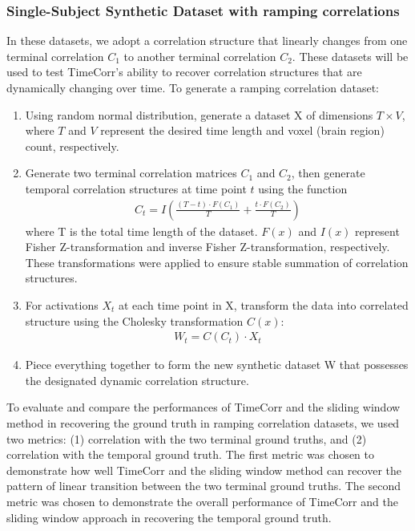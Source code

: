 \documentclass[11pt]{article}
\begin{document}
\subsubsection{Single-Subject Synthetic Dataset with ramping correlations}

In these datasets, we adopt a correlation structure that linearly changes from one terminal correlation $C_1$ to another terminal correlation $C_2$. These datasets will be used to test TimeCorr's ability to recover correlation structures that are dynamically changing over time. To generate a ramping correlation dataset:
\begin{enumerate}
\item Using random normal distribution, generate a dataset X of dimensions $T\times V$, where $T$ and $V$ represent the desired time length and voxel (brain region) count, respectively.
\item Generate two terminal correlation matrices $C_1$ and $C_2$, then generate temporal correlation structures at time point $t$ using the function
\begin{align*}
C_t = I\left(\frac{(T-t) \cdot F(C_1)}{T} + \frac{t\cdot F(C_2)}{T}\right)
\end{align*}
where T is the total time length of the dataset. $F(x)$ and $I(x)$ represent Fisher Z-transformation and inverse Fisher Z-transformation, respectively. These transformations were applied to ensure stable summation of correlation structures.
\item For activations $X_t$ at each time point in X, transform the data into correlated structure using the Cholesky transformation $C(x)$:
\begin{align*}
W_t = C(C_t) \cdot X_t
\end{align*}
\item Piece everything together to form the new synthetic dataset W that possesses the designated dynamic correlation structure.
\end{enumerate}

To evaluate and compare the performances of TimeCorr and the sliding window method in recovering the ground truth in ramping correlation datasets, we used two metrics: (1) correlation with the two terminal ground truths, and (2) correlation with the temporal ground truth. The first metric was chosen to demonstrate how well TimeCorr and the sliding window method can recover the pattern of linear transition between the two terminal ground truths. The second metric was chosen to demonstrate the overall performance of TimeCorr and the sliding window approach in recovering the temporal ground truth.
\end{document}
